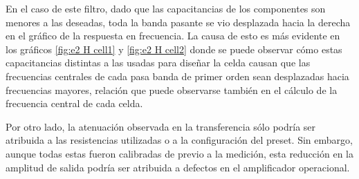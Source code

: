 En el caso de este filtro, dado que las capacitancias de los componentes son menores a las deseadas, toda la banda pasante se vio desplazada hacia la derecha en el gráfico de la respuesta en frecuencia. La causa de esto es más evidente en los gráficos \ref{fig:e2 H cell1} y \ref{fig:e2 H cell2} donde se puede observar cómo estas capacitancias distintas a las usadas para diseñar la celda causan que las frecuencias centrales de cada pasa banda de primer orden sean desplazadas hacia frecuencias mayores, relación que puede observarse también en el cálculo de la frecuencia central de cada celda.

Por otro lado, la atenuación observada en la transferencia sólo podría ser atribuida a las resistencias utilizadas o a la configuración del preset. Sin embargo, aunque todas estas fueron calibradas de previo a la medición, esta reducción en la amplitud de salida podría ser atribuida a defectos en el amplificador operacional.

